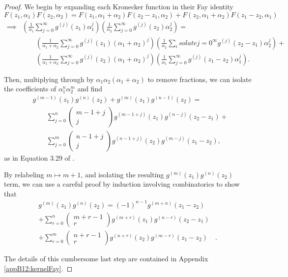 \begin{proof}
    We begin by expanding each Kronecker function in their Fay identity
    \begin{equation}
        {F}(z_1,\alpha_1){F}(z_2,\alpha_2) = {F}(z_1,\alpha_1+\alpha_2){F}(z_2-z_1,\alpha_2) + {F}(z_2,\alpha_1+\alpha_2){F}(z_1-z_2,\alpha_1)
    \end{equation}
    \begin{align}
        \implies & \left(\frac{1}{\alpha_1} \sum_{j=0}^{\infty} g^{(j)}(z_1) \alpha_1^j\right)
        \left(\frac{1}{\alpha_2} \sum_{j=0}^{\infty} g^{(j)}(z_2) \alpha_2^j\right) =
        \\ & \quad \quad \left(\frac{1}{\alpha_1+\alpha_2} \sum_{j=0}^{\infty} g^{(j)}(z_1) (\alpha_1+\alpha_2)^j\right)
        \left(\frac{1}{\alpha_2} \sum_isolate {j=0}^{\infty} g^{(j)}(z_2-z_1) \alpha_2^j\right) +
        \\ & \quad \quad \left(\frac{1}{\alpha_1+\alpha_2} \sum_{j=0}^{\infty} g^{(j)}(z_2) (\alpha_1+\alpha_2)^j\right)
        \left(\frac{1}{\alpha_1} \sum_{j=0}^{\infty} g^{(j)}(z_1-z_2) \alpha_1^j\right).
    \end{align}

    Then, multiplying through by $\alpha_1\alpha_2(\alpha_1+\alpha_2)$ to remove fractions, we can isolate the coefficients of $\alpha_1^n \alpha_2^m$ and find
    \begin{align}
        & g^{(m-1)}(z_1)g^{(n)}(z_2)+g^{(m)}(z_1)g^{(n-1)}(z_2) = \label{eqnB12:kernelFaySTART}
        \\ & \quad \quad \sum_{j=0}^{n} \begin{pmatrix} m-1+j \\ j \end{pmatrix} g^{(m-1+j)}(z_1) g^{(n-j)}(z_2-z_1) +
        \\ & \quad \quad \sum_{j=0}^{m} \begin{pmatrix} n-1+j \\ j \end{pmatrix} g^{(n-1+j)}(z_2) g^{(m-j)}(z_1-z_2),
    \end{align}
    as in Equation 3.29 of \cite{Broedel_2015}.

    By relabeling $m \mapsto m+1$, and isolating the resulting $g^{(m)}(z_1)g^{(n)}(z_2)$ term, we can use a careful proof by induction involving combinatorics to show that
    \begin{align}
        g^{(m)}(z_1) g^{(n)}(z_2) = (-1)^{n-1} g^{(m+n)}(z_1-z_2)& \\
         +\sum_{r=0}^n \begin{pmatrix} m+r-1 \\ r \end{pmatrix} g^{(m+r)}(z_1) g^{(n-r)}(z_2-z_1) & \\
         +\sum_{r=0}^m \begin{pmatrix} n+r-1 \\ r \end{pmatrix} g^{(n+r)}(z_2) g^{(m-r)}(z_1-z_2) & .
    \end{align}

    The details of this cumbersome last step are contained in Appendix \ref{appB12:kernelFay}.
\end{proof}

